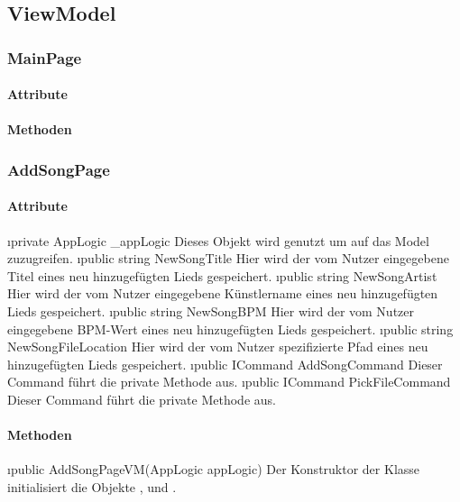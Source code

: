 \documentclass[../entwurf.tex]{subfiles}
\begin{document}
\subsection{ViewModel}
\subsubsection{MainPage}
\paragraph{Attribute}
\paragraph{Methoden}
\subsubsection{AddSongPage}
\paragraph{Attribute}
\begin{itemize}
	\i{private AppLogic \_appLogic} Dieses Objekt wird genutzt um auf das Model zuzugreifen.
	\i{public string NewSongTitle} Hier wird der vom Nutzer eingegebene Titel eines neu hinzugefügten Lieds gespeichert.
	\i{public string NewSongArtist} Hier wird der vom Nutzer eingegebene Künstlername eines neu hinzugefügten Lieds gespeichert.
	\i{public string NewSongBPM} Hier wird der vom Nutzer eingegebene BPM-Wert eines neu hinzugefügten Lieds gespeichert.
	\i{public string NewSongFileLocation} Hier wird der vom Nutzer spezifizierte Pfad eines neu hinzugefügten Lieds gespeichert.
	\i{public ICommand AddSongCommand} Dieser Command führt die private Methode  aus.
	\i{public ICommand PickFileCommand} Dieser Command führt die private Methode  aus.
\end{itemize}
\paragraph{Methoden}
\begin{itemize}
	\i{public AddSongPageVM(AppLogic appLogic)} Der Konstruktor der Klasse initialisiert die Objekte ,  und .
\end{itemize}
\end{document}

